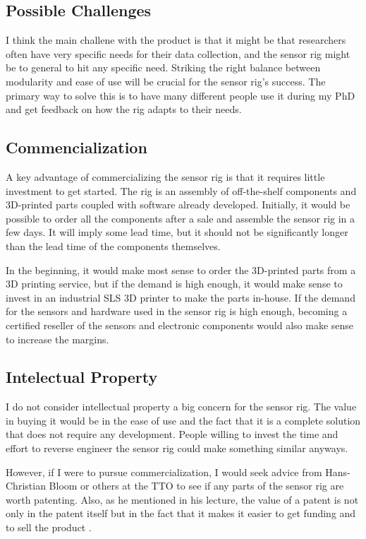 \documentclass{iopconfser}
\begin{document}
\subsection*{Possible Challenges}
I think the main challene with the product is that it might be that researchers often have very specific needs for their data collection, and the sensor rig might be to general to hit any specific need.
Striking the right balance between modularity and ease of use will be crucial for the sensor rig's success.
The primary way to solve this is to have many different people use it during my PhD and get feedback on how the rig adapts to their needs.

\subsection*{Commencialization}
A key advantage of commercializing the sensor rig is that it requires little investment to get started. 
The rig is an assembly of off-the-shelf components and 3D-printed parts coupled with software already developed.
Initially, it would be possible to order all the components after a sale and assemble the sensor rig in a few days.
It will imply some lead time, but it should not be significantly longer than the lead time of the components themselves.

In the beginning, it would make most sense to order the 3D-printed parts from a 3D printing service, but if the demand is high enough, it would make sense to invest in an industrial SLS 3D printer to make the parts in-house.
If the demand for the sensors and hardware used in the sensor rig is high enough, becoming a certified reseller of the sensors and electronic components would also make sense to increase the margins.

\subsection*{Intelectual Property}
I do not consider intellectual property a big concern for the sensor rig.
The value in buying it would be in the ease of use and the fact that it is a complete solution that does not require any development.
People willing to invest the time and effort to reverse engineer the sensor rig could make something similar anyways.

However, if I were to pursue commercialization, I would seek advice from Hans-Christian Bloom or others at the TTO to see if any parts of the sensor rig are worth patenting.
Also, as he mentioned in his lecture, the value of a patent is not only in the patent itself but in the fact that it makes it easier to get funding and to sell the product \cite{blomIntelectualProperty2024}.
\end{document}
